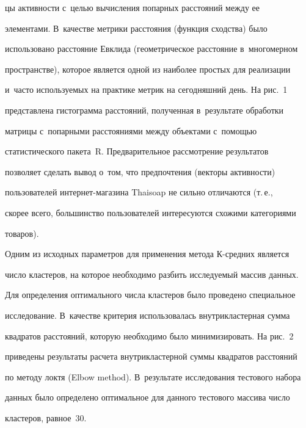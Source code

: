 цы активности с~целью вычисления попарных расстояний между ее 


элементами. В~качестве метрики рас\-сто\-яния (функция сходства) было 


использовано рас\-сто\-яние Евклида (геометрическое рас\-сто\-яние в~многомерном 


пространстве), которое является одной из наиболее простых для реализации 


и~часто используемых на практике метрик на сегодняшний день. На рис.~1 


пред\-став\-ле\-на гистограмма рас\-сто\-яний, полученная в~результате обработки 


матрицы с~попарными рас\-сто\-яни\-ями между объектами с~по\-мощью 


статистического пакета~R. Предварительное рассмотрение результатов 


поз\-во\-ля\-ет сделать вывод о~том, что предпочтения (векторы активности) 


пользователей ин\-тер\-нет-ма\-га\-зи\-на Thaisoap не сильно отличаются (т.\,е., 


скорее всего, большинство пользователей интересуются схожими категориями 


товаров).


   





  Одним из исходных параметров для применения метода К-сред\-них является 


число кластеров, на которое необходимо разбить исследуемый массив данных. 


Для определения оптимального числа кластеров было проведено специальное 


исследование. В~качестве критерия использовалась внутрикластерная сумма 


квадратов расстояний, которую необходимо было минимизировать. На рис.~2 


приведены результаты расчета внутрикластерной суммы квадратов расстояний 


по методу локтя (Elbow method). В~результате исследования тестового набора 


данных было определено оптимальное для данного тестового массива число 


кластеров, равное~30.


  


  






